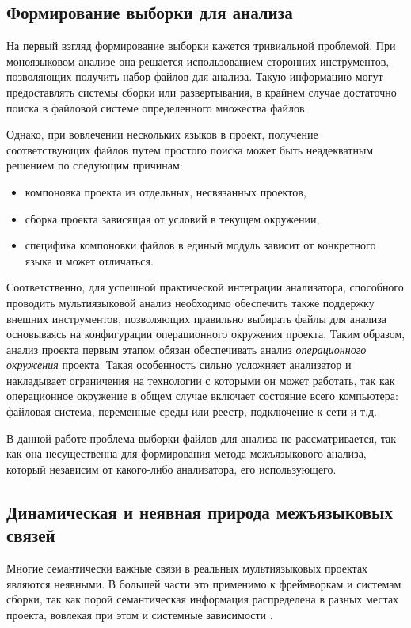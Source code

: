 \subsection{Формирование выборки для анализа} \label{ssec:selection}

На первый взгляд формирование выборки кажется тривиальной проблемой. При моноязыковом анализе она
решается использованием сторонних инструментов, позволяющих получить набор файлов для анализа.
Такую информацию могут предоставлять системы сборки или развертывания, в крайнем случае достаточно
поиска в файловой системе определенного множества файлов.

Однако, при вовлечении нескольких языков в проект, получение соответствующих файлов путем простого
поиска может быть неадекватным решением по следующим причинам:
\begin{itemize}
    \item компоновка проекта из отдельных, несвязанных проектов,
    \item сборка проекта зависящая от условий в текущем окружении,
    \item специфика компоновки файлов в единый модуль зависит от конкретного языка и может отличаться.
\end{itemize}

Соответственно, для успешной практической интеграции анализатора, способного проводить мультиязыковой анализ
необходимо обеспечить также поддержку внешних инструментов, позволяющих правильно выбирать файлы для
анализа основываясь на конфигурации операционного окружения проекта. Таким образом, анализ проекта
первым этапом обязан обеспечивать анализ \textit{операционного окружения} проекта. Такая особенность
сильно усложняет анализатор и накладывает ограничения на технологии с которыми он может работать, так
как операционное окружение в общем случае включает состояние всего компьютера: файловая система, переменные
среды или реестр, подключение к сети и т.д. 

В данной работе проблема выборки файлов для анализа
не рассматривается, так как она несущественна для формирования метода межъязыкового анализа, 
который независим от какого-либо анализатора, его использующего.

\subsection{Динамическая и неявная природа межъязыковых связей}

Многие семантически важные связи в реальных мультиязыковых проектах являются неявными. В большей части это применимо
к фреймворкам и системам сборки, так как порой семантическая информация распределена в разных местах проекта,
вовлекая при этом и системные зависимости \cite{professional-developers} \cite{external-dependencies}.


